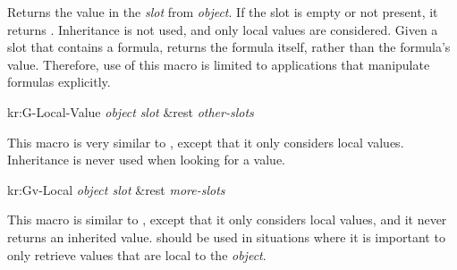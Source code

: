 Returns the value in the {\it slot} from {\it object}.  If the slot is
empty or not present, it returns \value{nil}.  Inheritance is not used, and
only local values are considered.
Given a slot that contains a formula,  returns the
formula itself, rather than the formula's value.  Therefore, use of this
macro is limited to applications that manipulate formulas explicitly.



% 
% 
\value{f-top}
\begin{example}
kr:G-Local-Value {\it object} {\it slot} \&rest {\it other-slots}\value{macro}
\end{example}

This macro is very similar to , except that it only considers
local values.  Inheritance is never used when looking for a value.



\value{f-top}
\begin{example}
kr:Gv-Local {\it object slot} \&rest {\it more-slots}\value{macro}
\end{example}

This macro is similar to , except that it only considers local
values, and it never returns an inherited value.   should be
used in situations where it is important to only retrieve values that are
local to the {\it object}.



% 
% 
% 
% 
% 
